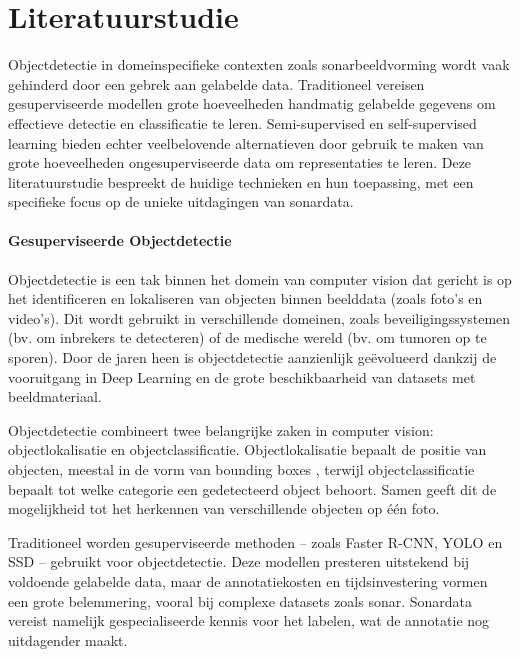 
\section{Literatuurstudie}%
\label{sec:literatuurstudie}

Objectdetectie in domeinspecifieke contexten zoals sonarbeeldvorming wordt vaak gehinderd door een gebrek aan gelabelde data. Traditioneel vereisen gesuperviseerde modellen grote hoeveelheden handmatig gelabelde gegevens om effectieve detectie en classificatie te leren. Semi-supervised en self-supervised learning bieden echter veelbelovende alternatieven door gebruik te maken van grote hoeveelheden ongesuperviseerde data om representaties te leren. Deze literatuurstudie bespreekt de huidige technieken en hun toepassing, met een specifieke focus op de unieke uitdagingen van sonardata.

\paragraph{Gesuperviseerde Objectdetectie}

Objectdetectie is een tak binnen het domein van computer vision dat gericht is op het identificeren en lokaliseren van objecten binnen beelddata (zoals foto's en video's). Dit wordt gebruikt in verschillende domeinen, zoals beveiligingssystemen (bv. om inbrekers te detecteren) of de medische wereld (bv. om tumoren op te sporen). Door de jaren heen is objectdetectie aanzienlijk geëvolueerd dankzij de vooruitgang in Deep Learning en de grote beschikbaarheid van datasets met beeldmateriaal. \autocite{He_2016} 

Objectdetectie combineert twee belangrijke zaken in computer vision: objectlokalisatie en objectclassificatie. Objectlokalisatie bepaalt de positie van objecten, meestal in de vorm van bounding boxes \autocite{Tompson_2015}, terwijl objectclassificatie bepaalt tot welke categorie een gedetecteerd object behoort. Samen geeft dit de mogelijkheid tot het herkennen van verschillende objecten op één foto.

Traditioneel worden gesuperviseerde methoden -- zoals Faster R-CNN, YOLO en SSD -- gebruikt voor objectdetectie. \autocite{Redmon_2016} Deze modellen presteren uitstekend bij voldoende gelabelde data, maar de annotatiekosten en tijdsinvestering vormen een grote belemmering, vooral bij complexe datasets zoals sonar. Sonardata vereist namelijk gespecialiseerde kennis voor het labelen, wat de annotatie nog uitdagender maakt. \autocite{Long_2015}


